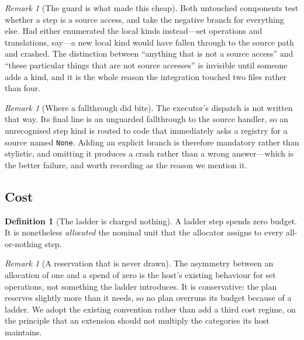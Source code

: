 \documentclass[11pt,twocolumn,a4paper]{article}
\theoremstyle{plain}
\theoremstyle{definition}
\newtheorem{definition}[theorem]{Definition}
\theoremstyle{remark}
\newtheorem{remark}[theorem]{Remark}
\newcommand{\hfq}[1]{\texttt{#1}}
\begin{document}
\begin{remark}[The guard is what made this cheap]
\label{rem:guard}
Both untouched components test whether a step is a source access, and take the
negative branch for everything else. Had either enumerated the local kinds
instead---set operations and translations, say---a new local kind would have
fallen through to the source path and crashed. The distinction between
``anything that is not a source access'' and ``these particular things that are
not source accesses'' is invisible until someone adds a kind, and it is the
whole reason the integration touched two files rather than four.
\end{remark}

\begin{remark}[Where a fallthrough did bite]
\label{rem:fallthrough}
The executor's dispatch is not written that way. Its final line is an
unguarded fallthrough to the source handler, so an unrecognised step kind is
routed to code that immediately asks a registry for a source named
\hfq{None}. Adding an explicit branch is therefore mandatory rather than
stylistic, and omitting it produces a crash rather than a wrong answer---which
is the better failure, and worth recording as the reason we mention it.
\end{remark}

\subsection{Cost}
\label{sec:cost}

\begin{definition}[The ladder is charged nothing]
\label{def:cost}
A ladder step spends zero budget. It is nonetheless \emph{allocated} the
nominal unit that the allocator assigns to every all-or-nothing step.
\end{definition}

\begin{remark}[A reservation that is never drawn]
\label{rem:reserve}
The asymmetry between an allocation of one and a spend of zero is the host's
existing behaviour for set operations, not something the ladder introduces. It
is conservative: the plan reserves slightly more than it needs, so no plan
overruns its budget because of a ladder. We adopt the existing convention
rather than add a third cost regime, on the principle that an extension should
not multiply the categories its host maintains.
\end{remark}
\end{document}
